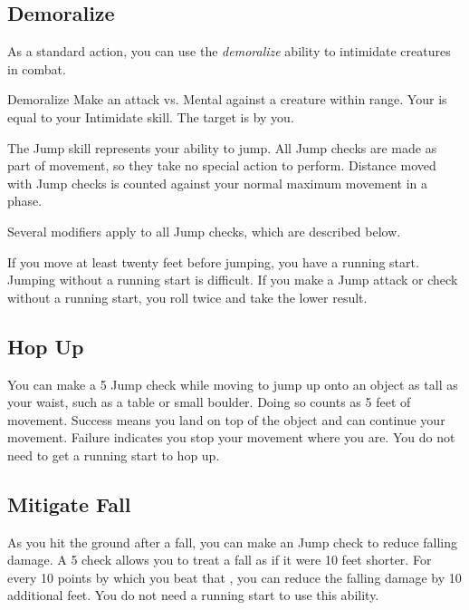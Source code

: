     \subsection{Demoralize}\label{Demoralize}

        As a standard action, you can use the \textit{demoralize} ability to intimidate creatures in combat.

        \begin{freeability}{Demoralize}
            Make an attack vs. Mental against a creature within \rngmed range.
            Your  is equal to your Intimidate skill.
            \hit The target is  \shaken by you.
        \end{freeability}

\newpage
{}
    The Jump skill represents your ability to jump.
    All Jump checks are made as part of movement, so they take no special action to perform. Distance moved with Jump checks is counted against your normal maximum movement in a phase.

        Several modifiers apply to all Jump checks, which are described below.

        \label{Running Start} If you move at least twenty feet before jumping, you have a running start.
        Jumping without a running start is difficult.
        If you make a Jump attack or check without a running start, you roll twice and take the lower result.

    \subsection{Hop Up}
        You can make a  5 Jump check while moving to jump up onto an object as tall as your waist, such as a table or small boulder. Doing so counts as 5 feet of movement. Success means you land on top of the object and can continue your movement. Failure indicates you stop your movement where you are. You do not need to get a running start to hop up.

    \subsection{Mitigate Fall}
        As you hit the ground after a fall, you can make an Jump check to reduce falling damage.
        A  5 check allows you to treat a fall as if it were 10 feet shorter.
        For every 10 points by which you beat that , you can reduce the falling damage by 10 additional feet.
        You do not need a running start to use this ability.


